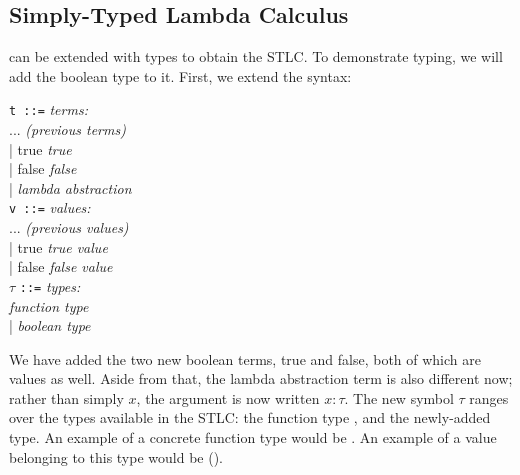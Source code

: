 \subsection{Simply-Typed Lambda Calculus}
\label{sec:STLC}

\lambdacalc{} can be extended with types to obtain the STLC. To demonstrate typing, we will add the boolean type to it. First, we extend the syntax:
\begin{center}
\texttt{t ::=} 								\hfill \textit{terms:} \\
\hspace{2em} ... 							\hfill \textit{(previous terms)} \\
\hspace{2em} | true							\hfill \textit{true} \\
\hspace{2em} | false	 					\hfill \textit{false} \\
\hspace{2em} | 		\hfill \textit{lambda abstraction} \\
\texttt{v ::=} 								\hfill \textit{values:} \\
\hspace{2em} ... 							\hfill \textit{(previous values)} \\
\hspace{2em} | true							\hfill \textit{true value} \\
\hspace{2em} | false						\hfill \textit{false value} \\
$\tau$ \texttt{::=} 						\hfill \textit{types:} \\
\hspace{2em} 			\hfill \textit{function type} \\
\hspace{2em} | \Boolt{}						\hfill \textit{boolean type}
\end{center}
We have added the two new boolean terms, true and false, both of which are values as well. Aside from that, the lambda abstraction term is also different now; rather than simply $x$, the argument is now written $x:\tau$. The new symbol $\tau$ ranges over the types available in the STLC: the function type , and the newly-added \Boolt{} type. An example of a concrete function type would be \fn{\Boolt{}}{\Boolt{}}. An example of a value belonging to this type would be ().

